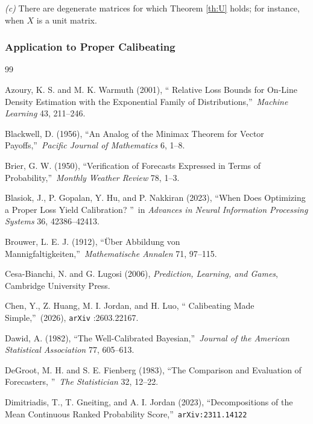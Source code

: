 \documentclass[12pt,a4paper,notitlepage]{article}
\begin{document}
\emph{(c)} There are degenerate matrices for which Theorem \ref{th:U} holds;
for instance, when $X$ is a unit matrix.

\subsubsection{Application to Proper Calibeating\label{susus-a:bxc
calibeating}}

\begin{thebibliography}{99}

\bibitem{} Azoury, K. S. and M. K. Warmuth (2001), \textquotedblleft
Relative Loss Bounds for On-Line Density Estimation with the Exponential
Family of Distributions,\textquotedblright\ \emph{Machine Learning} 43,
211--246.

\bibitem{} Blackwell, D. (1956), \textquotedblleft An Analog of the Minimax
Theorem for Vector Payoffs,\textquotedblright\ \emph{Pacific Journal of
Mathematics} 6, 1--8.

\bibitem{} Brier, G. W. (1950), \textquotedblleft Verification of Forecasts
Expressed in Terms of Probability,\textquotedblright\ \emph{Monthly Weather
Review} 78, 1--3.

\bibitem{} Blasiok, J., P. Gopalan, Y. Hu, and P. Nakkiran (2023),
\textquotedblleft When Does Optimizing a Proper Loss Yield Calibration?
\textquotedblright\ in \emph{Advances in Neural Information Processing
Systems} 36, 42386--42413.

\bibitem{} Brouwer, L. E. J. (1912), \textquotedblleft \"{U}ber Abbildung
von Mannigfaltigkeiten,\textquotedblright\ \emph{Mathematische Annalen} 71,
97--115.

\bibitem{} Cesa-Bianchi, N. and G. Lugosi (2006), \emph{Prediction,
Learning, and Games}, Cambridge University Press.

\bibitem{} Chen, Y., Z. Huang, M. I. Jordan, and H. Luo, \textquotedblleft
Calibeating Made Simple,\textquotedblright\ (2026), \texttt{arXiv}%
:2603.22167.

\bibitem{} Dawid, A. (1982), \textquotedblleft The Well-Calibrated
Bayesian,\textquotedblright\ \emph{Journal of the American Statistical
Association} 77, 605--613.

\bibitem{} DeGroot, M. H. and S. E. Fienberg (1983),
\textquotedblleft The Comparison and Evaluation of Forecasters,
\textquotedblright\ \emph{The Statistician} 32, 12--22.

\bibitem{} Dimitriadis, T., T. Gneiting, and A. I. Jordan (2023),
\textquotedblleft Decompositions of the Mean Continuous Ranked Probability
Score,\textquotedblright\ \texttt{arXiv:2311.14122}


\end{thebibliography}
\end{document}
